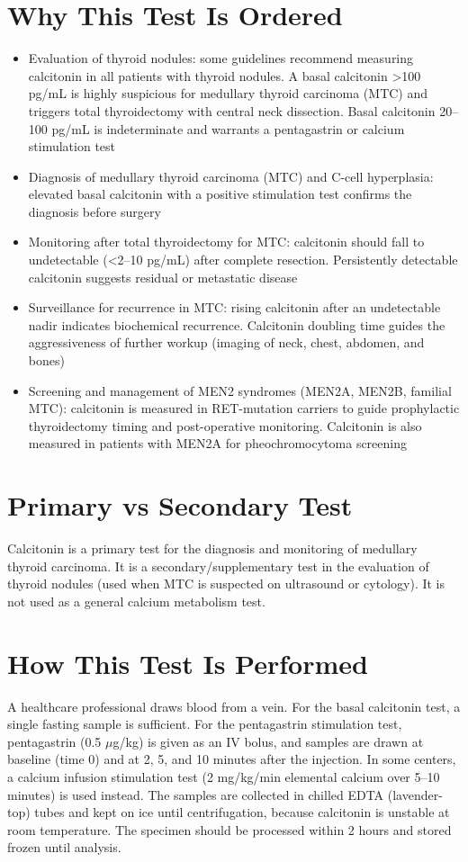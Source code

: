 \section*{Why This Test Is Ordered}
\begin{itemize}
  \item Evaluation of thyroid nodules: some guidelines recommend measuring calcitonin in all patients with thyroid nodules. A basal calcitonin >100 pg/mL is highly suspicious for medullary thyroid carcinoma (MTC) and triggers total thyroidectomy with central neck dissection. Basal calcitonin 20--100 pg/mL is indeterminate and warrants a pentagastrin or calcium stimulation test
  \item Diagnosis of medullary thyroid carcinoma (MTC) and C-cell hyperplasia: elevated basal calcitonin with a positive stimulation test confirms the diagnosis before surgery
  \item Monitoring after total thyroidectomy for MTC: calcitonin should fall to undetectable (<2--10 pg/mL) after complete resection. Persistently detectable calcitonin suggests residual or metastatic disease
  \item Surveillance for recurrence in MTC: rising calcitonin after an undetectable nadir indicates biochemical recurrence. Calcitonin doubling time guides the aggressiveness of further workup (imaging of neck, chest, abdomen, and bones)
  \item Screening and management of MEN2 syndromes (MEN2A, MEN2B, familial MTC): calcitonin is measured in RET-mutation carriers to guide prophylactic thyroidectomy timing and post-operative monitoring. Calcitonin is also measured in patients with MEN2A for pheochromocytoma screening
\end{itemize}

\section*{Primary vs Secondary Test}
Calcitonin is a primary test for the diagnosis and monitoring of medullary thyroid carcinoma. It is a secondary/supplementary test in the evaluation of thyroid nodules (used when MTC is suspected on ultrasound or cytology). It is not used as a general calcium metabolism test.

\section*{How This Test Is Performed}
A healthcare professional draws blood from a vein. For the basal calcitonin test, a single fasting sample is sufficient. For the pentagastrin stimulation test, pentagastrin (0.5 $\mu$g/kg) is given as an IV bolus, and samples are drawn at baseline (time 0) and at 2, 5, and 10 minutes after the injection. In some centers, a calcium infusion stimulation test (2 mg/kg/min elemental calcium over 5--10 minutes) is used instead. The samples are collected in chilled EDTA (lavender-top) tubes and kept on ice until centrifugation, because calcitonin is unstable at room temperature. The specimen should be processed within 2 hours and stored frozen until analysis.

